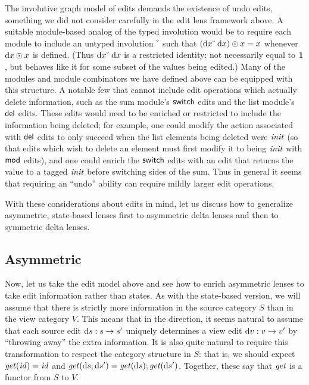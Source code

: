 The involutive graph model of edits demands the existence of undo edits,
something we did not consider carefully in the edit lens framework above. A
suitable module-based analog of the typed involution would be to require
each module to include an untyped involution $\breve{\ }$ such that
$(\textrm{d} x\breve{\ }\;\textrm{d} x)\odot x=x$ whenever $\textrm{d} x\odot x$ is defined. (Thus
$\textrm{d} x\breve{\ }\;\textrm{d} x$ is a restricted identity: not necessarily equal to $\mbox{\bf{1}}$,
but behaves like it for some subset of the values being edited.) Many of the
modules and module combinators we have defined above can be equipped with
this structure. A notable few that cannot include edit operations which
actually delete information, such as the sum module's $\mathsf{switch}$ edits
and the list module's $\mathsf{del}$ edits. These edits would need to be
enriched or restricted to include the information being deleted; for
example, one could modify the action associated with $\mathsf{del}$ edits to
only succeed when the list elements being deleted were $\mathit{init}$ (so that
edits which wish to delete an element must first modify it to being $\mathit{init}$
with $\mathsf{mod}$ edits), and one could enrich the $\mathsf{switch}$ edits with
an edit that returns the value to a tagged $\mathit{init}$ before switching sides of
the sum. Thus in general it seems that requiring an ``undo'' ability can
require mildly larger edit operations.

With these considerations about edits in mind, let us discuss how to
generalize asymmetric, state-based lenses first to asymmetric delta lenses
and then to symmetric delta lenses.

\subsection{Asymmetric}
\label{sec:delta:asymmetric}
Now, let us take the edit model above and see how to enrich asymmetric
lenses to take edit information rather than states. As with the state-based
version, we will assume that there is strictly more information in the
source category $S$ than in the view category $V$. This means that in the
\GET direction, it seems natural to assume that each source edit $\textrm{d} s : s
\to s'$ uniquely determines a view edit $\textrm{d} v : v \to v'$ by ``throwing
away'' the extra information. It is also quite natural to require this \GET
transformation to respect the category structure in $S$: that is, we should
expect $\mathit{get}(\mathit{id})=\mathit{id}$ and $\mathit{get}(\textrm{d} s;\textrm{d} s')=\mathit{get}(\textrm{d} s);\mathit{get}(\textrm{d} s')$.
Together, these say that $\mathit{get}$ is a functor from $S$ to $V$.

